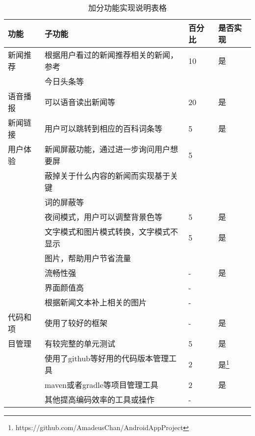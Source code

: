 \documentclass[UTF8]{ctexart}
\begin{document}
\begin{table*}[!htb]
\centering
\caption{加分功能实现说明表格}
\label{additional functions}
\begin{tabular}{llll}
\toprule
功能 &子功能 &百分比 &是否实现\\
\midrule
新闻推荐 &根据用户看过的新闻推荐相关的新闻，参考 &10 &是\\
&今日头条等 &&\\
语音播报 &可以语音读出新闻等 &20 &是\\
新闻链接 &用户可以跳转到相应的百科词条等 &5 &是\\
用户体验 &新闻屏蔽功能，通过进一步询问用户想要屏 &5 &\\
&蔽掉关于什么内容的新闻而实现基于关键 &&\\
&词的屏蔽等 &&\\
&夜间模式，用户可以调整背景色等 &5 &是\\
&文字模式和图片模式转换，文字模式不显示 &5 &是\\
&图片，帮助用户节省流量 &&\\
&流畅性强 &- &是\\
&界面颜值高 &- &\\
&根据新闻文本补上相关的图片 &- &\\
代码和项&使用了较好的框架 &- &是\\
目管理&有较完整的单元测试 &5 &是\\
&使用了github等好用的代码版本管理工具 &2 &是\footnote{https://github.com/AmadeusChan/AndroidAppProject}\\
&maven或者gradle等项目管理工具 &2 &是\\
&其他提高编码效率的工具或操作 &- &\\
\bottomrule
\end{tabular}
\end{table*}

\newpage
\end{document}
